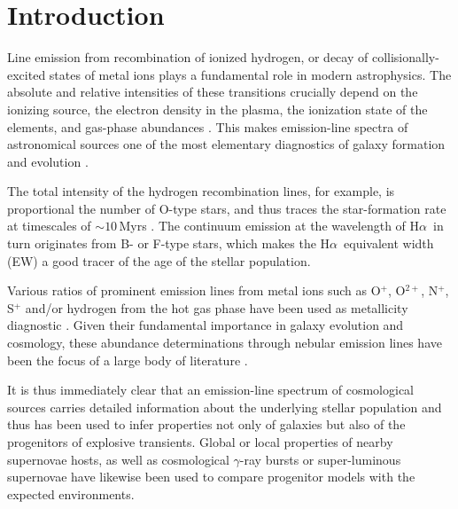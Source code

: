 \documentclass[traditabstract]{aa}
\newcommand{\ha}{H$\alpha$}
\begin{document}
\maketitle

\section{Introduction}
\label{sec:Intro}

Line emission from recombination of ionized hydrogen, or decay of collisionally-excited states of metal ions plays a fundamental role in modern astrophysics. The absolute and relative intensities of these transitions crucially depend on the ionizing source, the electron density in the plasma, the ionization state of the elements, and gas-phase abundances \citep{1989agna.book.....O}. This makes emission-line spectra of astronomical sources one of the most elementary diagnostics of galaxy formation and evolution \citep[e.g.,][]{2004ApJ...613..898T, 2006ApJ...644..813E, 2009ApJ...706.1364F}.


The total intensity of the hydrogen recombination lines, for example, is proportional the number of O-type stars, and thus traces the star-formation rate at timescales of $\sim 10$\,Myrs \citep[e.g.,][]{1998ARA&A..36..189K}. The continuum emission at the wavelength of \ha\, in turn originates from B- or F-type stars, which makes the \ha\, equivalent width (EW) a good tracer of the age of the stellar population.

Various ratios of prominent emission lines from metal ions such as O$^{+}$, O$^{2+}$, N$^{+}$, S$^{+}$ and/or hydrogen from the hot gas phase have been used as metallicity diagnostic \citep{1979MNRAS.189...95P, 1979A&A....78..200A}. Given their fundamental importance in galaxy evolution and cosmology, these abundance determinations through nebular emission lines have been the focus of a large body of literature \citep[e.g.,][]{2004ApJ...617..240K, 2005ApJ...631..231P, 2006A&A...454L.127S, 2006A&A...448..955I, 2008ApJ...681.1183K}.

It is thus immediately clear that an emission-line spectrum of cosmological sources carries detailed information about the underlying stellar population and thus has been used to infer properties not only of galaxies but also of the progenitors of explosive transients. Global \citep[e.g.,][]{2008ApJ...673..999P, 2011MNRAS.412.1441L} or local \citep[e.g.,][]{2010MNRAS.407.2660A, 2011ApJ...731L...4M, 2011A&A...530A..95L} properties of nearby supernovae hosts, as well as cosmological $\gamma$-ray bursts \citep[e.g.,][]{2007A&A...464..529W, 2012A&A...546A...8K, 2013ApJ...774..119G} or super-luminous supernovae \citep[e.g.,][]{2013ApJ...763L..28C, 2014ApJ...787..138L, 2014arXiv1409.8331L, 2016arXiv160408207P} have likewise been used to compare progenitor models with the expected environments. 
\end{document}
